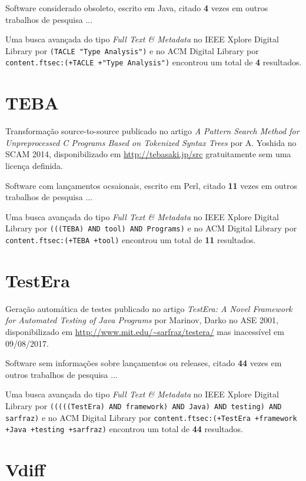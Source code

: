 Software considerado obsoleto,
escrito em Java,
citado {\bf 4} vezes em outros trabalhos de pesquisa ...

Uma busca avançada do tipo {\it Full Text \& Metadata} no IEEE Xplore Digital Library por
\texttt{(TACLE "Type Analysis")}
e no ACM Digital Library por
\texttt{content.ftsec:(+TACLE +"Type Analysis")}
encontrou um total de
{\bf 4}
resultados.

\section{TEBA}

Transformação source-to-source
publicado no artigo {\it A Pattern Search Method for Unpreprocessed C Programs Based on Tokenized Syntax Trees}
por A. Yoshida
no SCAM 2014,
disponibilizado em \url{http://tebasaki.jp/src}
gratuitamente
sem uma licença definida.

Software com lançamentos ocsaionais,
escrito em Perl,
citado {\bf 11} vezes em outros trabalhos de pesquisa ...

Uma busca avançada do tipo {\it Full Text \& Metadata} no IEEE Xplore Digital Library por
\texttt{(((TEBA) AND tool) AND Programs)}
e no ACM Digital Library por
\texttt{content.ftsec:(+TEBA +tool)}
encontrou um total de
{\bf 11}
resultados.

\section{TestEra}

Geração automática de testes
publicado no artigo {\it TestEra: A Novel Framework for Automated Testing of Java Programs}
por Marinov, Darko
no ASE 2001,
disponibilizado em \url{http://www.mit.edu/~sarfraz/testera/}
mas inacessível em 09/08/2017.

Software sem informações sobre lançamentos ou releases,
citado {\bf 44} vezes em outros trabalhos de pesquisa ...

Uma busca avançada do tipo {\it Full Text \& Metadata} no IEEE Xplore Digital Library por
\texttt{(((((TestEra) AND framework) AND Java) AND testing) AND sarfraz)}
e no ACM Digital Library por
\texttt{content.ftsec:(+TestEra +framework +Java +testing +sarfraz)}
encontrou um total de
{\bf 44}
resultados.

\section{Vdiff}

